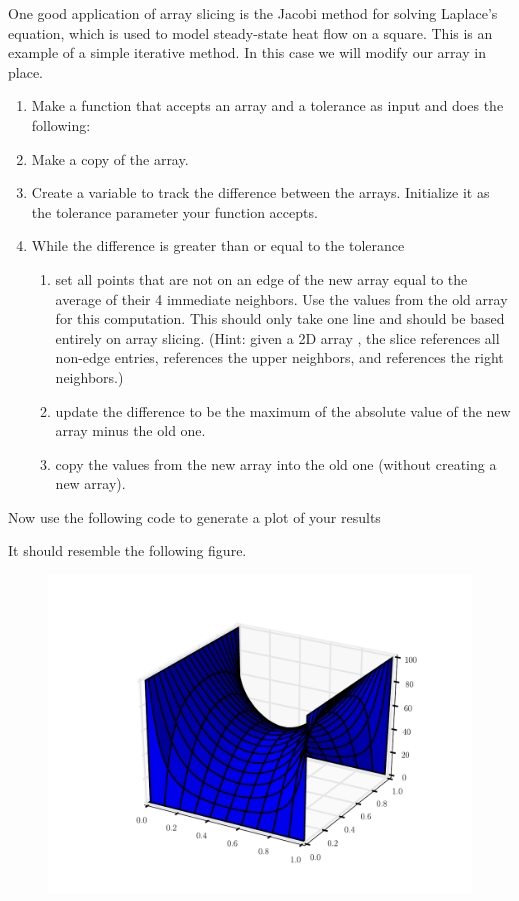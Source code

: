 \begin{problem} 
One good application of array slicing is the Jacobi
method for solving Laplace's equation, which is used to model
steady-state heat flow on a square. This is an example of a simple
iterative method. In this case we will modify our array in place. 
\begin{enumerate}
\item Make a function that accepts an array and a tolerance as input and does the
following: 
\item Make a copy of the array. 
\item Create a variable to track the difference between the arrays. Initialize
it as the tolerance parameter your function accepts. 
\item While the difference is greater than or equal
to the tolerance 
\begin{enumerate} 
\item set all points that are not on an edge of the new array equal to the average of their 4 immediate neighbors. Use the values from the old array for this computation. 
This should only take one line and should be based entirely on array slicing.
(Hint: given a 2D array , the slice  references
all non-edge entries,  references the upper neighbors,
and  references the right neighbors.) 
\item update the difference to be the maximum of the absolute value of the new array
minus the old one. 
\item copy the values from the new array into the old
one (without creating a new array). 
\end{enumerate} 
\end{enumerate}

Now use the following code to generate a plot of your results
 
It should resemble the following figure.

\begin{figure} [H]
\includegraphics[width=.75\textwidth]{laplace.pdf}
\end{figure} 
\end{problem}

